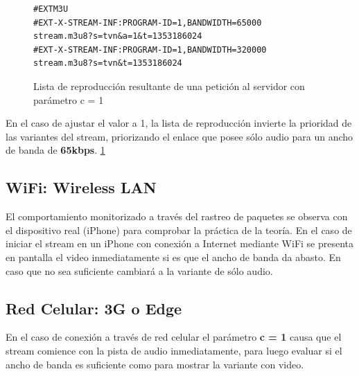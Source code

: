 \begin{figure}[H]
	\centering
\begin{lstlisting}
#EXTM3U
#EXT-X-STREAM-INF:PROGRAM-ID=1,BANDWIDTH=65000
stream.m3u8?s=tvn&a=1&t=1353186024
#EXT-X-STREAM-INF:PROGRAM-ID=1,BANDWIDTH=320000
stream.m3u8?s=tvn&t=1353186024
\end{lstlisting}
\caption{Lista de reproducción resultante de una petición al servidor con parámetro c = 1}
\label{lst:playlistc1}
\end{figure}

En el caso de ajustar el valor a 1, la lista de reproducción invierte la prioridad de las variantes del stream, priorizando el enlace que posee sólo audio para un ancho de banda de \textbf{65kbps}. \ref{lst:playlistc1}


  \subsection{WiFi: Wireless LAN}
  El comportamiento monitorizado a través del rastreo de paquetes se observa con el dispositivo real (iPhone) para comprobar la práctica de la teoría.
  En el caso de iniciar el stream en un iPhone con conexión a Internet mediante WiFi se presenta en pantalla el video inmediatamente si es que el ancho de banda da abasto. En caso que no sea suficiente cambiará a la variante de sólo audio.
  
  
  

  \subsection{Red Celular: 3G o Edge}
En el caso de conexión a través de red celular el parámetro \textbf{c = 1} causa que el stream comience con la pista de audio inmediatamente, para luego evaluar si el ancho de banda es suficiente como para mostrar la variante con video.

